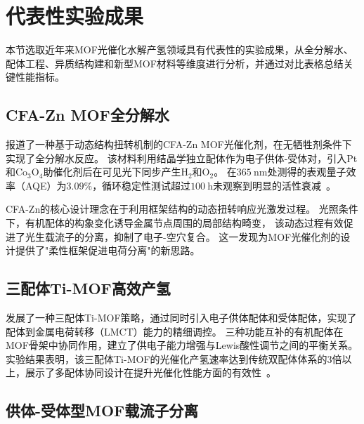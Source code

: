\section{代表性实验成果}\label{sec:experiments}

本节选取近年来MOF光催化水解产氢领域具有代表性的实验成果，从全分解水、配体工程、异质结构建和新型MOF材料等维度进行分析，并通过对比表格总结关键性能指标。


\subsection{CFA-Zn MOF全分解水}

\citet{cfazn2025ows}报道了一种基于动态结构扭转机制的CFA-Zn MOF光催化剂，在无牺牲剂条件下实现了全分解水反应。 %
该材料利用结晶学独立配体作为电子供体-受体对，引入Pt和Co$_3$O$_4$助催化剂后在可见光下同步产生H$_2$和O$_2$。
在$365~\mathrm{nm}$处测得的表观量子效率（AQE）为$3.09\%$，循环稳定性测试超过$100~\mathrm{h}$未观察到明显的活性衰减~\citep{cfazn2025ows}。 %

CFA-Zn的核心设计理念在于利用框架结构的动态扭转响应光激发过程。
光照条件下，有机配体的构象变化诱导金属节点周围的局部结构畸变，
该动态过程有效促进了光生载流子的分离，抑制了电子-空穴复合。
这一发现为MOF光催化剂的设计提供了"柔性框架促进电荷分离"的新思路。


\subsection{三配体Ti-MOF高效产氢}

\citet{liu2024three_ligand_timof}发展了一种三配体Ti-MOF策略，通过同时引入电子供体配体和受体配体，实现了配体到金属电荷转移（LMCT）能力的精细调控。 %
三种功能互补的有机配体在MOF骨架中协同作用，建立了供电子能力增强与Lewis酸性调节之间的平衡关系。
实验结果表明，该三配体Ti-MOF的光催化产氢速率达到传统双配体体系的3倍以上，展示了多配体协同设计在提升光催化性能方面的有效性~\citep{liu2024three_ligand_timof}。 %


\subsection{供体-受体型MOF载流子分离}

